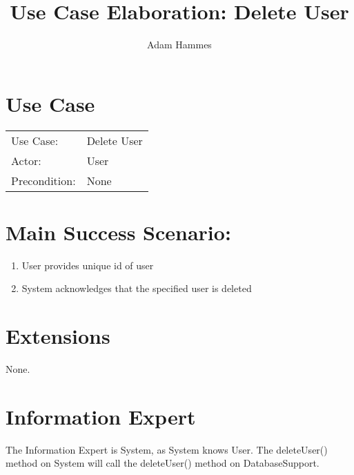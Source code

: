 \documentclass{article}
\title{Use Case Elaboration: Delete User}
\author{ Adam Hammes }
\begin{document}
\maketitle


\section*{Use Case}
\begin{tabular}{l l}
Use Case:     & Delete User\\
Actor:        & User\\
Precondition: & None\\
\end{tabular}


\section*{Main Success Scenario:}

\begin{enumerate}
    \item User provides unique id of user
    \item System acknowledges that the specified user is deleted

\end{enumerate}

\section*{Extensions}

None.


\section*{Information Expert}

The Information Expert is System, as System knows User.
The deleteUser() method on System will call the deleteUser() method on DatabaseSupport.
\end{document}
